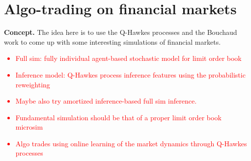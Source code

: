\chapter{\sffamily Algo-trading on financial markets}

{\bfseries\sffamily Concept.} The idea here is to use the Q-Hawkes processes and the Bouchaud work to come up with some interesting simulations of financial markets. 

\textcolor{red}{
\begin{itemize}
\item{Full sim: fully individual agent-based stochastic model for limit order book}
\item{Inference model: Q-Hawkes process inference features using the probabilistic reweighting }
\item{Maybe also try amortized inference-based full sim inference.}
\end{itemize}
}

\textcolor{red}{
\begin{itemize}
\item{Fundamental simulation should be that of a proper limit order book microsim~\cite{bouchaud2018trades}}
\item{Algo trades using online learning of the market dynamics through Q-Hawkes processes} 
\end{itemize}
}


